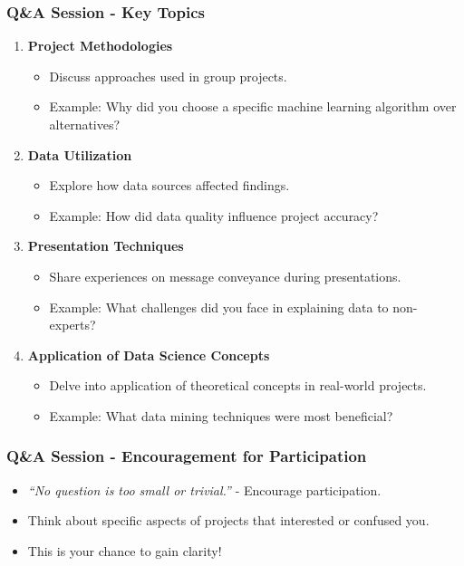 \documentclass[aspectratio=169]{beamer}
\begin{document}
\begin{frame}[fragile]
    \frametitle{Q\&A Session - Key Topics}
    \begin{enumerate}
        \item \textbf{Project Methodologies}
            \begin{itemize}
                \item Discuss approaches used in group projects.
                \item Example: Why did you choose a specific machine learning algorithm over alternatives?
            \end{itemize}
        \item \textbf{Data Utilization}
            \begin{itemize}
                \item Explore how data sources affected findings.
                \item Example: How did data quality influence project accuracy?
            \end{itemize}
        \item \textbf{Presentation Techniques}
            \begin{itemize}
                \item Share experiences on message conveyance during presentations.
                \item Example: What challenges did you face in explaining data to non-experts?
            \end{itemize}
        \item \textbf{Application of Data Science Concepts}
            \begin{itemize}
                \item Delve into application of theoretical concepts in real-world projects.
                \item Example: What data mining techniques were most beneficial?
            \end{itemize}
    \end{enumerate}
\end{frame}

\begin{frame}[fragile]
    \frametitle{Q\&A Session - Encouragement for Participation}
    \begin{itemize}
        \item \textit{``No question is too small or trivial.''} - Encourage participation.
        \item Think about specific aspects of projects that interested or confused you.
        \item This is your chance to gain clarity!
    \end{itemize}
\end{frame}
\end{document}
